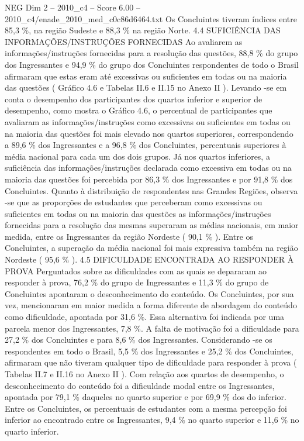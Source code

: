 \begin{textsample}{NEG Dim 2 – 2010\_c4 – Score 6.00 – 2010\_c4/enade\_2010\_med\_c0c86d6464.txt}
Os Concluintes tiveram índices entre 85,3 \%, na região Sudeste e 88,3 \% na região Norte. 4.4 SUFICIÊNCIA DAS INFORMAÇÕES/INSTRUÇÕES FORNECIDAS Ao avaliarem as informações/instruções fornecidas para a resolução das questões, 88,8 \% do grupo dos Ingressantes e 94,9 \% do grupo dos Concluintes respondentes de todo o Brasil afirmaram que estas eram até excessivas ou suficientes em todas ou na maioria das questões ( Gráfico 4.6 e Tabelas II.6 e II.15 no Anexo II ).
Levando -se em conta o desempenho dos participantes dos quartos inferior e superior de desempenho, como mostra o Gráfico 4.6, o percentual de participantes que avaliaram as informações/instruções como excessivas ou suficientes em todas ou na maioria das questões foi mais elevado nos quartos superiores, correspondendo a 89,6 \% dos Ingressantes e a 96,8 \% dos Concluintes, percentuais superiores à média nacional para cada um dos dois grupos.
Já nos quartos inferiores, a suficiência das informações/instruções declarada como excessiva em todas ou na maioria das questões foi percebida por 86,3 \% dos Ingressantes e por 91,8 \% dos Concluintes.
Quanto à distribuição de respondentes nas Grandes Regiões, observa -se que as proporções de estudantes que perceberam como excessivas ou suficientes em todas ou na maioria das questões as informações/instruções fornecidas para a resolução das mesmas superaram as médias nacionais, em maior medida, entre os Ingressantes da região Nordeste ( 90,1 \% ).
Entre os Concluintes, a superação da média nacional foi mais expressiva também na região Nordeste ( 95,6 \% ). 4.5 DIFICULDADE ENCONTRADA AO RESPONDER À PROVA Perguntados sobre as dificuldades com as quais se depararam ao responder à prova, 76,2 \% do grupo de Ingressantes e 11,3 \% do grupo de Concluintes apontaram o desconhecimento do conteúdo.
Os Concluintes, por sua vez, mencionaram em maior medida a forma diferente de abordagem do conteúdo como dificuldade, apontada por 31,6 \%.
Essa alternativa foi indicada por uma parcela menor dos Ingressantes, 7,8 \%.
A falta de motivação foi a dificuldade para 27,2 \% dos Concluintes e para 8,6 \% dos Ingressantes.
Considerando -se os respondentes em todo o Brasil, 5,5 \% dos Ingressantes e 25,2 \% dos Concluintes, afirmaram que não tiveram qualquer tipo de dificuldade para responder à prova ( Tabelas II.7 e II.16 no Anexo II ).
Com relação aos quartos de desempenho, o desconhecimento do conteúdo foi a dificuldade modal entre os Ingressantes, apontada por 79,1 \% daqueles no quarto superior e por 69,9 \% dos do inferior.
Entre os Concluintes, os percentuais de estudantes com a mesma percepção foi inferior ao encontrado entre os Ingressantes, 9,4 \% no quarto superior e 11,6 \% no quarto inferior.

\end{textsample}
